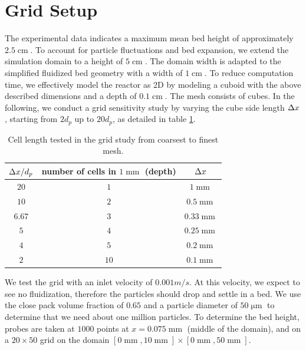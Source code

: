
\section{Grid Setup}
The experimental data indicates a maximum mean bed height of approximately $2.5 \operatorname{cm}$. To account for particle fluctuations and bed expansion, we extend the  simulation domain to a height of $5 \operatorname{cm}$. The domain width is adapted to the simplified fluidized bed geometry with a width of $1 \operatorname{cm}$.
To reduce computation time, we effectively model the reactor as 2D by modeling a cuboid with the above described dimensions and a depth of $0.1 \operatorname{cm}$.
The mesh consists of cubes. 
In the following, we conduct a grid sensitivity study by varying the cube side length $\Delta x$, starting from $2 d_p$ up to $20 d_p$, as detailed in table \ref{tab:grid_sizes}.
\begin{table}[h!]
    \centering
    \begin{tabular}{c|c|c}
       $\Delta x /d_p$  & number of cells in $1 \operatorname{mm}$ (depth) &  $\Delta x$ \\
       \hline
        $20$ & $1$ & $1 \operatorname{mm}$ \\
        $10$ & $2$ &$0.5 \operatorname{mm}$ \\
        $6.67$ & $3$ &$0.33 \operatorname{mm}$ \\
        $5$ & $4$ &$0.25 \operatorname{mm}$ \\
        $4$ & $5$ &$0.2 \operatorname{mm}$ \\
        $2$ & $10$ &$0.1 \operatorname{mm}$
    \end{tabular}
    \caption{Cell length tested in the grid study from coarsest to finest mesh.}
    \label{tab:grid_sizes}
\end{table}
We test the grid with an inlet velocity of $0.001 m/s$. At this velocity, we expect to see no fluidization, therefore the particles should drop and settle in a bed.
We use the close pack volume fraction of $0.65$ and a particle diameter of $50 \operatorname{\mu m}$
to determine that we need about one million particles. %
To determine the bed height, probes are taken at $1000$ points at $x = 0.075\operatorname{mm}$ (middle of the domain), and on a $20 \times 50$ grid on the domain $ [0\operatorname{mm},10\operatorname{mm}] \times [0\operatorname{mm},50\operatorname{mm}]$.
